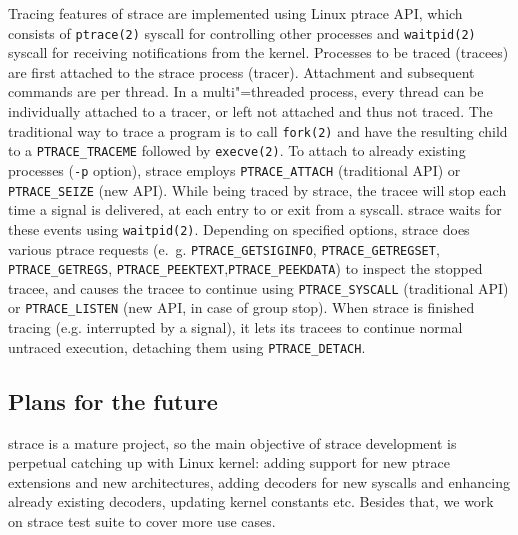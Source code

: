\documentclass[10pt, a5paper]{article}
\def\vv!#1!{\texttt{#1}}
\begin{document}
Tracing features of strace are implemented using Linux ptrace API, which consists of \vv!ptrace(2)! syscall for controlling other processes and \vv!waitpid(2)! syscall for receiving notifications from the kernel.  Processes to be traced (tracees) are first attached to the strace process (tracer).  Attachment and subsequent commands are per thread.  In a multi"=threaded process, every thread can be individually attached to a tracer, or left not attached and thus not traced.  The traditional way to trace a program is to call \vv!fork(2)! and have the resulting child to a \vv!PTRACE\_TRACEME! followed by \vv!execve(2)!.  To attach to  already existing processes (\vv!-p! option), strace employs \vv!PTRACE\_ATTACH! (traditional API) or \vv!PTRACE\_SEIZE! (new API).  While being traced by strace, the tracee will stop each time a signal is delivered, at each entry to or exit  from a syscall.  strace waits for these events using \vv!waitpid(2)!.  Depending on specified options, strace does various ptrace requests (e.~g. \vv!PTRACE\_GET\-SIGINFO!, \vv!PTRACE\_GETREGSET!, \vv!PTRACE\_GETREGS!, \vv!PTRACE\_PEEKTEXT!,\linebreak \vv!PTRACE\_PEEKDATA!) to inspect the stopped tracee, and causes the tracee to continue using \vv!PTRACE\_SYSCALL!  (traditional API) or \vv!PTRACE\_LISTEN! (new API, in case of group stop).  When strace is finished tracing (e.g. interrupted by a signal), it lets its tracees to continue normal untraced execution, detaching them using \vv!PTRACE\_DETACH!.

\subsection*{Plans for the future}

strace is a mature project, so the main objective of strace development is perpetual catching up with Linux kernel: adding support for new ptrace extensions and new architectures, adding decoders for new syscalls and enhancing already existing decoders, updating kernel constants etc.  Besides that, we work on strace test suite to cover more use cases.
\end{document}
